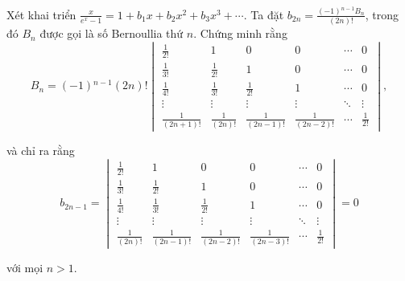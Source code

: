 \documentclass[class=linear-algebra,crop=false]{standalone}
\begin{document}
\begin{exercise}
	\par Xét khai triển $\frac{x}{e^{x} - 1} = 1 + b_{1}x + b_{2}x^{2} + b_{3}x^{3} + \cdots$. Ta đặt $b_{2n} = \frac{(-1){}^{n-1}B_{n}}{(2n)!}$, trong đó $B_{n}$ được gọi là số Bernoullia thứ $n$. Chứng minh rằng
	\[
		B_{n} = (-1){}^{n-1}(2n)!
		\begin{vmatrix}
			\frac{1}{2!}      & 1               & 0                 & 0                 & \cdots & 0            \\
			\frac{1}{3!}      & \frac{1}{2!}    & 1                 & 0                 & \cdots & 0            \\
			\frac{1}{4!}      & \frac{1}{3!}    & \frac{1}{2!}      & 1                 & \cdots & 0            \\
			\vdots            & \vdots          & \vdots            & \vdots            & \ddots & \vdots       \\
			\frac{1}{(2n+1)!} & \frac{1}{(2n)!} & \frac{1}{(2n-1)!} & \frac{1}{(2n-2)!} & \cdots & \frac{1}{2!}
		\end{vmatrix},
	\]
	\par và chỉ ra rằng
	\[
		b_{2n-1} =
		\begin{vmatrix}
			\frac{1}{2!}    & 1                 & 0                 & 0                 & \cdots & 0            \\
			\frac{1}{3!}    & \frac{1}{2!}      & 1                 & 0                 & \cdots & 0            \\
			\frac{1}{4!}    & \frac{1}{3!}      & \frac{1}{2!}      & 1                 & \cdots & 0            \\
			\vdots          & \vdots            & \vdots            & \vdots            & \ddots & \vdots       \\
			\frac{1}{(2n)!} & \frac{1}{(2n-1)!} & \frac{1}{(2n-2)!} & \frac{1}{(2n-3)!} & \cdots & \frac{1}{2!}
		\end{vmatrix}
		= 0
	\]
	\par với mọi $n > 1$.
\end{exercise}
\end{document}
